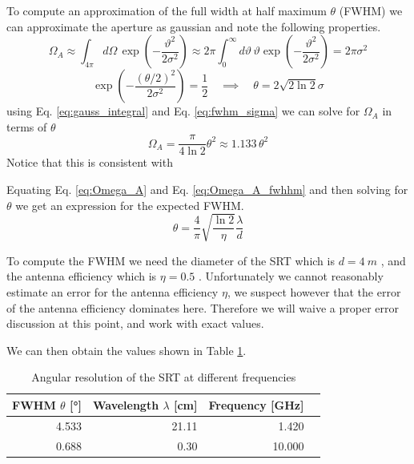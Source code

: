 To compute an approximation of the full width at half maximum $\theta$ (FWHM) we can approximate the aperture as gaussian \cite[p. 2]{srt} and note the following properties.
\begin{equation}
    \Omega_A \approx \int_{4\pi } d\Omega\, \exp{\left( -\frac{\vartheta^2}{2\sigma^2} \right)} \approx 2\pi \int_0^{\infty} d\vartheta \, \vartheta \exp{\left( -\frac{\vartheta^2}{2\sigma^2} \right)} = 2\pi \sigma^2
    \label{eq:gauss_integral}
\end{equation}
\begin{equation}
    \exp{\left( -\frac{(\theta/2)^2}{2\sigma^2}\right)} = \frac{1}{2} \quad \implies \quad \theta = 2 \sqrt{2\ln{2}} \sigma \label{eq:fwhm_sigma}
\end{equation}
using Eq. \eqref{eq:gauss_integral} and Eq. \eqref{eq:fwhm_sigma} we can solve for $\Omega_A$ in terms of $\theta$
\begin{equation}
    \Omega_A = \frac{\pi}{4\ln{2}} \theta^2 \approx 1.133 \, \theta^2 \label{eq:Omega_A_fwhhm}
\end{equation}
Notice that this is consistent with \cite[Eq. (8.13)]{wilson_tools_2009}

Equating Eq. \eqref{eq:Omega_A} and Eq. \eqref{eq:Omega_A_fwhhm} and then solving for $\theta$ we get an expression for the expected FWHM.
\begin{equation}
    \theta = \frac{4}{\pi} \sqrt{\frac{\ln{2}}{\eta}}\frac{\lambda}{d} \label{eq:fwhm}
\end{equation}

To compute the FWHM we need the diameter of the SRT which is $d = \SI{4}{m}$ \cite[p. 4]{srt}, and the antenna efficiency which is $\eta = 0.5$ \cite[p. 2]{srt}.
Unfortunately we cannot reasonably estimate an error for the antenna efficiency $\eta$, we suspect however that the error of the antenna efficiency dominates here.
Therefore we will waive a proper error discussion at this point, and work with exact values.

We can then obtain the values shown in Table \ref{tab:ang_res}.
\begin{table}[H]
    \centering
    \begin{tabular}{rrrr}
        \toprule
        FWHM $\theta$ [\si{\degree}] & Wavelength $\lambda$ [\si{cm}] & Frequency [\si{\giga \hertz}]\\
        \midrule
        \num{4.533} & \num{21.11} & \num{1.420}\\
        \num{0.688} & \num{0.30} & \num{10.000}\\
        \bottomrule
    \end{tabular}
    \caption{Angular resolution of the SRT at different frequencies}
    \label{tab:ang_res}
\end{table}
